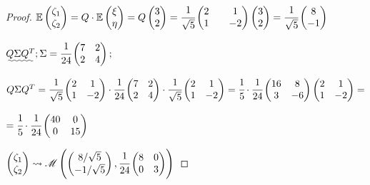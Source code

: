 \begin{proof}
 	$ \mathbb E\begin{pmatrix} \zeta_1 \\ \zeta_2 \end{pmatrix}=Q\cdot\mathbb E\begin{pmatrix} \xi \\ \eta \end{pmatrix}=Q\begin{pmatrix} 3 \\ 2 \end{pmatrix}=\cfrac{1}{\sqrt{5}}\begin{pmatrix} 2 && 1 \\ 1 && -2 \end{pmatrix}\begin{pmatrix} 3 \\ 2 \end{pmatrix} = \cfrac{1}{\sqrt{5}}\begin{pmatrix} 8 \\ -1 \end{pmatrix} $
 	
 	$ \uwave{Q \Sigma Q^T}; \Sigma = \cfrac1{24}\begin{pmatrix} 7 & 2 \\ 2 & 4 \end{pmatrix}; $
 	
 	$ Q \Sigma Q^T = \cfrac{1}{\sqrt{5}}\begin{pmatrix} 2 & 1 \\ 1 & -2 \end{pmatrix}\cdot\cfrac{1}{24}\begin{pmatrix} 7 & 2 \\ 2 & 4 \end{pmatrix}\cdot\cfrac{1}{\sqrt{5}}\begin{pmatrix} 2 & 1 \\ 1 & -2 \end{pmatrix}=\cfrac15\cdot\cfrac1{24}\begin{pmatrix} 16 & 8 \\ 3 & -6 \end{pmatrix}\begin{pmatrix} 2 & 1 \\ 1 & -2 \end{pmatrix}= $
 	
 	$ =\cfrac15\cdot\cfrac1{24}\begin{pmatrix} 40 & 0 \\ 0 & 15 \end{pmatrix} $

	$ \begin{pmatrix} \zeta_1 \\ \zeta_2 \end{pmatrix} \rightsquigarrow \mathscr{M} \left(\begin{pmatrix} 8/\sqrt{5} \\ -1/\sqrt{5} \end{pmatrix}, \cfrac1{24}\begin{pmatrix} 8 & 0 \\ 0 & 3 \end{pmatrix}\right) $
	
\end{proof}

